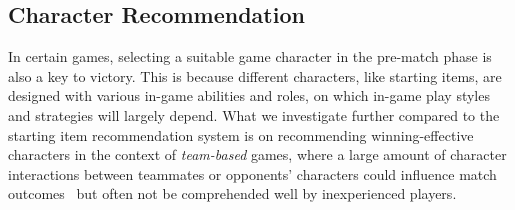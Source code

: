 
\subsection{Character Recommendation}\label{sec:thesis_overview:character_recom}
In certain games, selecting a suitable game character in the pre-match phase is also a key to victory. This is because different characters, like starting items, are designed with various in-game abilities and roles, on which in-game play styles and strategies will largely depend. What we investigate further compared to the starting item recommendation system is on recommending winning-effective characters in the context of \textit{team-based} games, where a large amount of character interactions between teammates or opponents' characters could influence match outcomes~\cite{pobie1,Semenov2016,kim2016proficiency} but often not be comprehended well by inexperienced players.


